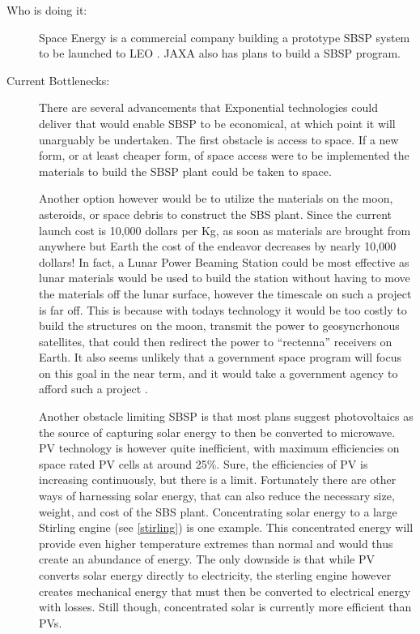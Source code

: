 \begin{description}
\item[Who is doing it:] Space  Energy is a commercial company building a prototype SBSP system to be  launched to LEO  \cite{SpaceEnergy2010}. JAXA also has plans to build a SBSP  program.
 
\item[Current Bottlenecks:] There  are several advancements that Exponential technologies could deliver  that would enable SBSP to be economical, at which point it will  unarguably be undertaken. The first obstacle is access to space. If a  new form, or at least cheaper form, of space access were to be  implemented the materials to build the SBSP plant could be taken to  space.
 
Another option however would be to  utilize the materials on the moon, asteroids, or space debris to  construct the SBS plant. Since the current launch cost is 10,000 dollars  per Kg, as soon as materials are brought from anywhere but Earth the  cost of the endeavor decreases by nearly 10,000 dollars! In fact, a  Lunar Power Beaming Station could be most effective as lunar materials  would be used to build the station without having to move the materials  off the lunar surface, however the timescale on such a project is far  off. This is because with todays technology it would be too costly to  build the structures on the moon, transmit the power to geosyncrhonous satellites,  that could then redirect the power to ``rectenna'' receivers on Earth. It also seems  unlikely that a government space program will focus on this goal in the  near term, and it would take a government agency to afford such a  project \cite{Seboldt2004}.
 
Another obstacle limiting SBSP is  that most plans suggest photovoltaics as the source of capturing solar  energy to then be converted to microwave. \gls{PV} technology is however quite  inefficient, with maximum efficiencies on space rated \gls{PV} cells at  around 25\%. Sure, the efficiencies of \gls{PV} is increasing continuously, but  there is a limit. Fortunately there are other ways of harnessing solar  energy, that can also reduce the necessary size, weight, and cost of the  SBS plant. Concentrating solar energy to a large Stirling engine (see \autoref{stirling}) is one  example. This concentrated energy will provide even higher temperature  extremes than normal and would thus create an abundance of energy. The  only downside is that while \gls{PV} converts solar energy directly to  electricity, the sterling engine however creates mechanical energy that  must then be converted to electrical energy with losses. Still though,  concentrated solar is currently more efficient than \glspl{PV}.
 
\end{description}


